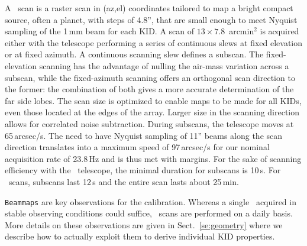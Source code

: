 A \bm\ scan is a raster scan in (az,el) coordinates tailored to map a
bright compact source, often a planet, with steps of 4.8'', that are
small enough to meet Nyquist sampling of the 1\,mm beam for each KID. A scan of 
$13\times7.8$~arcmin$^2$ is acquired either with the telescope
performing a series of continuous slews at fixed elevation or at fixed azimuth. 
A continuous scanning slew defines a subscan. 
The fixed-elevation scanning has the advantage of nulling the air-mass variation
across a subscan, while the fixed-azimuth scanning offers an
orthogonal scan direction to the former:
the combination of both gives a more accurate determination of the far side
lobes.
The scan size is optimized to enable maps to be made for all
KIDs, even those located at the edges of the array. Larger size in the scanning
direction allows for correlated noise subtraction.
During subscans, the telescope moves at
65\,arcsec/s.
The need to have Nyquist sampling of 11'' beams along the
scan direction translates into a maximum speed of 97\,arcsec/s
for our nominal acquisition rate of 23.8\,Hz and is thus met with
margins. For the sake of scanning efficiency with the \trentemetre\
telescope, the minimal duration for subscans is 10\,s. For \bm\ scans,
subscans last 12\,s and the entire scan lasts about 25\,min.%

{\tt Beammaps} are key observations for the calibration. {\lp Whereas
a single \bm\ acquired in stable observing conditions could suffice,
\bm\ scans are performed on a daily basis.}
More details on these observations are given in Sect.~\ref{se:geometry}
where we describe how to actually exploit them to derive individual KID
properties.


